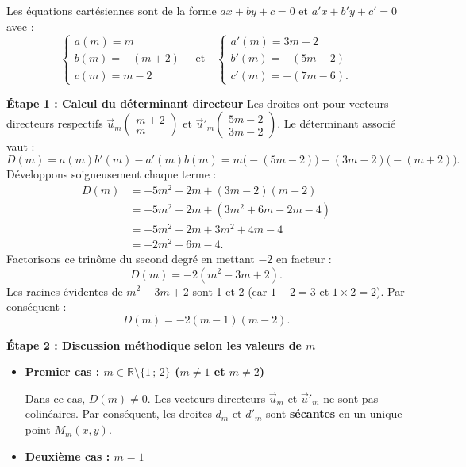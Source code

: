 \documentclass[11pt,a4paper]{article}
\newcommand{\R}{\mathbb{R}}
\begin{document}
\begin{correctionbox}
Les équations cartésiennes sont de la forme $ax + by + c = 0$ et $a'x + b'y + c' = 0$ avec :
\[
\begin{cases}
a(m) = m \\
b(m) = -(m + 2) \\
c(m) = m - 2
\end{cases}
\quad \text{et} \quad
\begin{cases}
a'(m) = 3m - 2 \\
b'(m) = -(5m - 2) \\
c'(m) = -(7m - 6).
\end{cases}
\]

\textbf{Étape 1 : Calcul du déterminant directeur}
Les droites ont pour vecteurs directeurs respectifs $\vec{u}_m\begin{pmatrix} m+2 \\ m \end{pmatrix}$ et $\vec{u}'_m\begin{pmatrix} 5m-2 \\ 3m-2 \end{pmatrix}$.
Le déterminant associé vaut :
\[
D(m) = a(m)b'(m) - a'(m)b(m) = m\bigl(-(5m - 2)\bigr) - (3m - 2)\bigl(-(m + 2)\bigr).
\]
Développons soigneusement chaque terme :
\begin{align*}
D(m) &= -5m^2 + 2m + (3m - 2)(m + 2) \\
&= -5m^2 + 2m + (3m^2 + 6m - 2m - 4) \\
&= -5m^2 + 2m + 3m^2 + 4m - 4 \\
&= -2m^2 + 6m - 4.
\end{align*}
Factorisons ce trinôme du second degré en mettant $-2$ en facteur :
\[
D(m) = -2(m^2 - 3m + 2).
\]
Les racines évidentes de $m^2 - 3m + 2$ sont 1 et 2 (car $1 + 2 = 3$ et $1 \times 2 = 2$). Par conséquent :
\[
D(m) = -2(m - 1)(m - 2).
\]

\textbf{Étape 2 : Discussion méthodique selon les valeurs de $m$}

\begin{itemize}[leftmargin=1cm]
    \item \textbf{Premier cas : $m \in \R \setminus \{1 \,;\, 2\}$ ($m \neq 1$ et $m \neq 2$)}
    
    Dans ce cas, $D(m) \neq 0$. Les vecteurs directeurs $\vec{u}_m$ et $\vec{u}'_m$ ne sont pas colinéaires.
    Par conséquent, les droites $d_m$ et $d'_m$ sont \textbf{sécantes} en un unique point $M_m(x, y)$.

    \item \textbf{Deuxième cas : $m = 1$}
    

\end{itemize}
\end{correctionbox}
\end{document}
